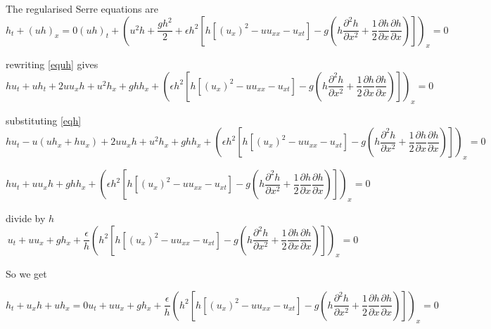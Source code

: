 \documentclass[subeqn]{article}
\begin{document}
The  regularised Serre equations are
\begin{subequations}
	\begin{equation}
	\label{eqh}
	h_t + (uh)_x = 0
	\end{equation}
	\begin{equation}
	\label{equh}
	(uh)_t + \left(u^2h + \frac{gh^2}{2} + \epsilon h^2 \left[h\left[\left(u_x \right)^2 - uu_{xx} - u_{xt} \right]  - g \left ( h \dfrac{\partial^2 h}{\partial x^2}  + \dfrac{1}{2} \dfrac{\partial h}{\partial x} \dfrac{\partial h}{\partial x} \right )\right] \right)_x = 0
	\end{equation}
\end{subequations}

rewriting \eqref{equh} gives
\[hu_t + uh_t + 2u u_x h + u^2h_x + ghh_x + \left( \epsilon h^2 \left[h\left[\left(u_x \right)^2 - uu_{xx} - u_{xt} \right]  - g \left ( h \dfrac{\partial^2 h}{\partial x^2}  + \dfrac{1}{2} \dfrac{\partial h}{\partial x} \dfrac{\partial h}{\partial x} \right )\right]\right)_x  = 0\]

substituting  \eqref{eqh}
\[hu_t - u\left(uh_x + hu_x\right) + 2u u_x h + u^2h_x + ghh_x + \left( \epsilon h^2 \left[h\left[\left(u_x \right)^2 - uu_{xx} - u_{xt} \right]  - g \left ( h \dfrac{\partial^2 h}{\partial x^2}  + \dfrac{1}{2} \dfrac{\partial h}{\partial x} \dfrac{\partial h}{\partial x} \right )\right]\right)_x = 0\]

\[hu_t +  u u_x h + ghh_x +  \left( \epsilon h^2 \left[h\left[\left(u_x \right)^2 - uu_{xx} - u_{xt} \right]  - g \left ( h \dfrac{\partial^2 h}{\partial x^2}  + \dfrac{1}{2} \dfrac{\partial h}{\partial x} \dfrac{\partial h}{\partial x} \right )\right]\right)_x = 0\]

divide by $h$
\[u_t +  u u_x  + gh_x + \frac{\epsilon}{h}\left( h^2 \left[h\left[\left(u_x \right)^2 - uu_{xx} - u_{xt} \right]  - g \left ( h \dfrac{\partial^2 h}{\partial x^2}  + \dfrac{1}{2} \dfrac{\partial h}{\partial x} \dfrac{\partial h}{\partial x} \right )\right]\right)_x = 0\]

So we get

\begin{subequations}
	\label{eqexp}
	\begin{equation}
	\label{eqhexp}
	h_t + u_xh + u h_x = 0
	\end{equation}
	\begin{equation}
	\label{equhexp}
	u_t +  u u_x  + gh_x + \frac{\epsilon}{h}\left( h^2 \left[h\left[\left(u_x \right)^2 - uu_{xx} - u_{xt} \right]  - g \left ( h \dfrac{\partial^2 h}{\partial x^2}  + \dfrac{1}{2} \dfrac{\partial h}{\partial x} \dfrac{\partial h}{\partial x} \right )\right]\right)_x= 0	
	\end{equation}
\end{subequations}
\end{document}
